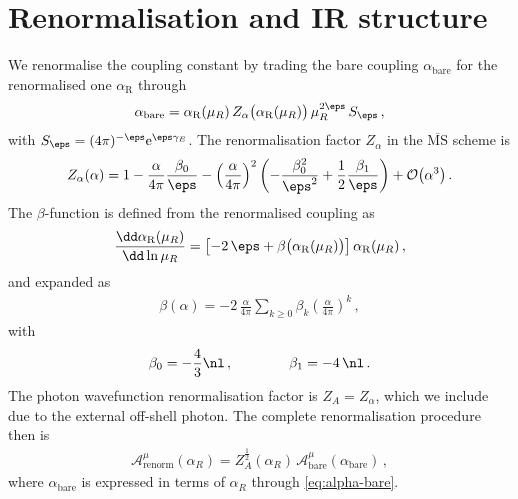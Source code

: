 \section{Renormalisation and \acl{IR} structure}
\label{app:poles}

We renormalise the coupling constant by trading the bare coupling $\alpha_{\mathrm{bare}}$ for the renormalised one $\alpha_{\mathrm{R}}$ through
\begin{align}
    \label{eq:alpha-bare}
    \alpha_{\mathrm{bare}} = \alpha_{\mathrm{R}}(\mu_R) \, Z_{\alpha}\bigl(\alpha_{\mathrm{R}}(\mu_R) \bigr)  \, \mu_R^{2 \eps} \, S_{\eps} \,,
\end{align}
with $S_\eps=(4\pi)^{-\eps} \mathrm{e}^{\eps\gamma_E}$.
The renormalisation factor $Z_{\alpha}$ in the $\overline{\text{MS}}$ scheme is \cite{Barnreuther:2013qvf,Bonciani:2021okt}
\begin{align}
    \label{eq:Za}
    Z_{\alpha}(\alpha) = 1 - \frac{\alpha}{4 \pi} \frac{\beta_0}{\eps} -
    \left(\frac{\alpha}{4 \pi}\right)^2 \left( -\frac{\beta_0^2}{\eps^2} + \frac{1}{2}\frac{\beta_1}{\eps} \right) + \mathcal{O}\bigl(\alpha^3\bigr) \,.
\end{align}
The $\beta$-function is defined from the renormalised coupling as
\begin{align} \label{eq:beta_func_def}
\frac{\dd \alpha_{\rm R}(\mu_R)}{\dd \ln \mu_R} = \left[ -2 \, \eps + \beta\bigl(\alpha_{\rm R}(\mu_R)\bigr) \right]  \alpha_{\rm R}(\mu_R) \,,
\end{align}
and expanded as
\begin{align} \label{eq:beta_func}
\beta( \alpha ) = -2 \, \frac{\alpha}{4 \pi}  \sum_{k\ge 0} \beta_k \left(\frac{\alpha}{4\pi} \right)^k \,,
\end{align}
with 
\begin{align} \label{eq:beta_coeffs}
\beta_0 = -\frac{4}{3} \nl \,, \qquad \qquad \beta_1 = - 4 \, \nl \,.
\end{align}
The photon wavefunction renormalisation factor is $Z_A=Z_\alpha$, which we include due to the external off-shell photon.
The complete renormalisation procedure then is
\begin{align}
    \mathcal{A}^\mu_\text{renorm}(\alpha_R) = Z_A^{\frac{1}{2}}(\alpha_R) \, \mathcal{A}^\mu_\text{bare}(\alpha_\text{bare}) \, ,
\end{align}
where $\alpha_\text{bare}$ is expressed in terms of $\alpha_R$ through \cref{eq:alpha-bare}.

